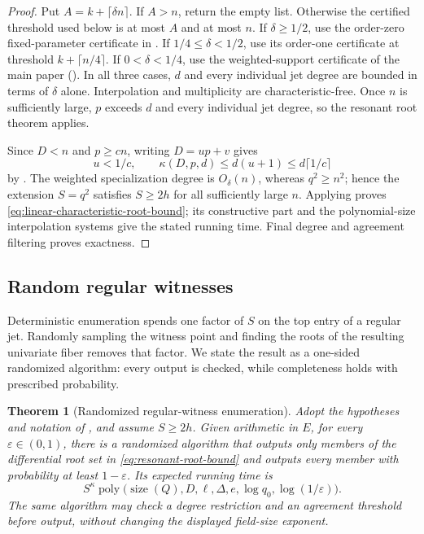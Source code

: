 \documentclass[11pt,letterpaper]{article}
\newtheorem{theorem}{Theorem}[section]
\theoremstyle{definition}
\newcommand{\poly}{\operatorname{poly}}
\begin{document}
\begin{proof}
Put \(A=k+\lceil\delta n\rceil\). If \(A>n\), return the empty list.
Otherwise the certified threshold used below is at most \(A\) and at most
\(n\).
If \(\delta\geq1/2\), use the order-zero fixed-parameter certificate in
.  If \(1/4\leq\delta<1/2\), use its
order-one certificate at threshold \(k+\lceil n/4\rceil\).  If
\(0<\delta<1/4\), use the weighted-support certificate of the main paper
().  In all three
cases, \(d\) and every individual jet degree are bounded in terms of
\(\delta\) alone. Interpolation and multiplicity are characteristic-free.
Once \(n\) is sufficiently large, \(p\) exceeds \(d\) and every individual
jet degree, so the resonant root theorem applies.

Since \(D<n\) and \(p\geq cn\), writing \(D=up+v\) gives
\[
  u<1/c,
  \qquad
  \kappa(D,p,d)\leq d(u+1)\leq d\lceil1/c\rceil
\]
by .  The weighted specialization degree
is \(O_\delta(n)\), whereas \(q^2\geq n^2\); hence the extension
\(S=q^2\) satisfies \(S\geq2h\) for all sufficiently large \(n\).
Applying  proves
\eqref{eq:linear-characteristic-root-bound}; its constructive part and the
polynomial-size interpolation systems give the stated running time.  Final
degree and agreement filtering proves exactness.
\end{proof}

\subsection{Random regular witnesses}

Deterministic enumeration spends one factor of \(S\) on the top entry of a
regular jet.  Randomly sampling the witness point and finding the roots of
the resulting univariate fiber removes that factor.  We state the result as
a one-sided randomized algorithm: every output is checked, while
completeness holds with prescribed probability.

\begin{theorem}[Randomized regular-witness enumeration]
\label{thm:random-regular-witnesses}
Adopt the hypotheses and notation of , and
assume \(S\geq2h\).  Given arithmetic in \(E\), for every
\(\varepsilon\in(0,1)\), there is a
randomized algorithm that outputs only members of the differential root set
in \eqref{eq:resonant-root-bound} and outputs every member with probability
at least \(1-\varepsilon\).  Its expected running time is
\begin{equation}
  S^\kappa
  \poly\bigl(
    \operatorname{size}(Q),D,\ell,\Delta,e,\log q_0,
    \log(1/\varepsilon)
  \bigr).
  \label{eq:random-witness-time}
\end{equation}
The same algorithm may check a degree restriction and an agreement
threshold before output, without changing the displayed field-size
exponent.
\end{theorem}
\end{document}
